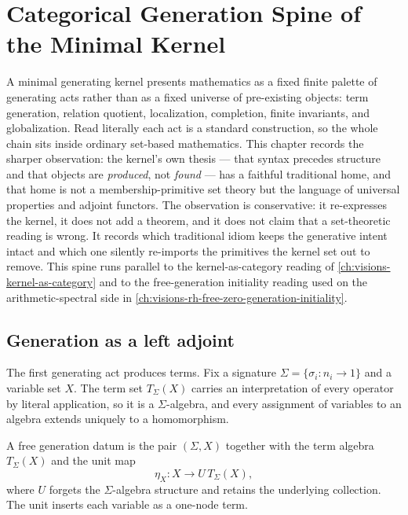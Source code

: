 \chapter{Categorical Generation Spine of the Minimal Kernel}
\label{ch:visions-ontology-kernel-categorical-generation-spine}

A minimal generating kernel presents mathematics as a fixed finite palette of
generating acts rather than as a fixed universe of pre-existing objects: term
generation, relation quotient, localization, completion, finite invariants,
and globalization.  Read literally each act is a standard construction, so the
whole chain sits inside ordinary set-based mathematics.  This chapter records
the sharper observation: the kernel's own thesis --- that syntax precedes
structure and that objects are \emph{produced}, not \emph{found} --- has a
faithful traditional home, and that home is not a membership-primitive set
theory but the language of universal properties and adjoint functors.  The
observation is conservative: it re-expresses the kernel, it does not add a
theorem, and it does not claim that a set-theoretic reading is wrong.  It
records which traditional idiom keeps the generative intent intact and which
one silently re-imports the primitives the kernel set out to remove.  This
spine runs parallel to the kernel-as-category reading of
\autoref{ch:visions-kernel-as-category} and to the free-generation initiality
reading used on the arithmetic-spectral side in
\autoref{ch:visions-rh-free-zero-generation-initiality}.

\section{Generation as a left adjoint}
\label{sec:ontology-kernel-generation-as-left-adjoint}

The first generating act produces terms.  Fix a signature
$\Sigma=\{\sigma_i:n_i\to1\}$ and a variable set $X$.  The term set
$T_\Sigma(X)$ carries an interpretation of every operator by literal
application, so it is a $\Sigma$-algebra, and every assignment of variables to
an algebra extends uniquely to a homomorphism.

\begin{definition}
\label{def:ontology-kernel-free-generation-datum}
A free generation datum is the pair $(\Sigma,X)$ together with the term algebra
$T_\Sigma(X)$ and the unit map
$$
\eta_X:X\longrightarrow U\,T_\Sigma(X),
$$
where $U$ forgets the $\Sigma$-algebra structure and retains the underlying
collection.  The unit inserts each variable as a one-node term.
\end{definition}

